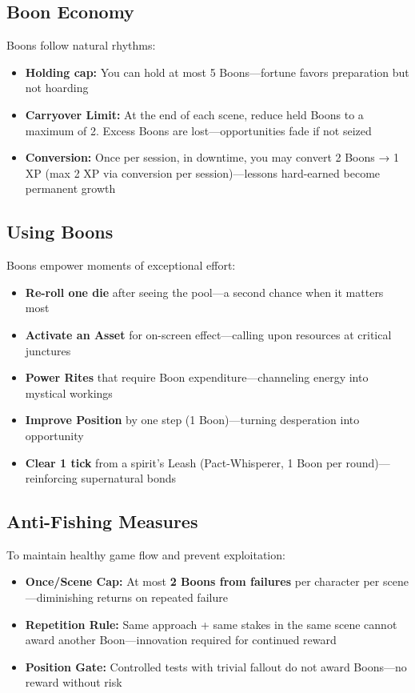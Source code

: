 \subsection*{Boon Economy}

Boons follow natural rhythms:

\begin{itemize}
    \item \textbf{Holding cap:} You can hold at most 5 Boons—fortune favors preparation but not hoarding
    \item \textbf{Carryover Limit:} At the end of each scene, reduce held Boons to a maximum of 2. Excess Boons are lost—opportunities fade if not seized
    \item \textbf{Conversion:} Once per session, in downtime, you may convert 2 Boons → 1 XP (max 2 XP via conversion per session)—lessons hard-earned become permanent growth
\end{itemize}

\subsection*{Using Boons}

Boons empower moments of exceptional effort:

\begin{itemize}
    \item \textbf{Re-roll one die} after seeing the pool—a second chance when it matters most
    \item \textbf{Activate an Asset} for on-screen effect—calling upon resources at critical junctures
    \item \textbf{Power Rites} that require Boon expenditure—channeling energy into mystical workings
    \item \textbf{Improve Position} by one step (1 Boon)—turning desperation into opportunity
    \item \textbf{Clear 1 tick} from a spirit's Leash (Pact-Whisperer, 1 Boon per round)—reinforcing supernatural bonds
\end{itemize}

\subsection*{Anti-Fishing Measures}

To maintain healthy game flow and prevent exploitation:

\begin{itemize}
    \item \textbf{Once/Scene Cap:} At most \textbf{2 Boons from failures} per character per scene—diminishing returns on repeated failure
    \item \textbf{Repetition Rule:} Same approach + same stakes in the same scene cannot award another Boon—innovation required for continued reward
    \item \textbf{Position Gate:} Controlled tests with trivial fallout do not award Boons—no reward without risk
\end{itemize}

